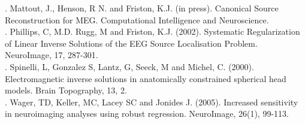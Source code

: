 . Mattout, J., Henson, R N. and Friston, K.J. (in press). Canonical Source Reconstruction for MEG. Computational Intelligence and Neuroscience.\\

. Phillips, C, M.D. Rugg, M and Friston, K.J. (2002). Systematic Regularization of Linear Inverse Solutions of the EEG Source Localisation Problem. NeuroImage, 17, 287-301.\\

. Spinelli, L, Gonzalez S, Lantz, G, Seeck, M and Michel, C. (2000). Electromagnetic inverse solutions in anatomically constrained spherical head models. Brain Topography, 13, 2.\\

. Wager, TD, Keller, MC, Lacey SC and Jonides J. (2005). Increased sensitivity in neuroimaging analyses using robust regression. NeuroImage, 26(1), 99-113.\\